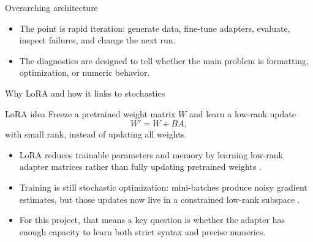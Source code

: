\documentclass[aspectratio=169,professionalfonts]{beamer}
\begin{document}
\begin{frame}{Overarching architecture}
\centering
{}

\vspace{0.8em}
\begin{itemize}[itemsep=0.5em]
    \item The point is rapid iteration: generate data, fine-tune adapters, evaluate, inspect failures, and change the next run.
    \item The diagnostics are designed to tell whether the main problem is formatting, optimization, or numeric behavior.
\end{itemize}
\end{frame}

\begin{frame}{Why LoRA and how it links to stochastics}
\begin{block}{LoRA idea}
Freeze a pretrained weight matrix $W$ and learn a low-rank update
\[
W' = W + BA,
\]
with small rank, instead of updating all weights.
\end{block}

\begin{itemize}[itemsep=0.6em]
    \item LoRA reduces trainable parameters and memory by learning low-rank adapter matrices rather than fully updating pretrained weights \cite{lora}.
    \item Training is still stochastic optimization: mini-batches produce noisy gradient estimates, but those updates now live in a constrained low-rank subspace \cite{peft}.
    \item For this project, that means a key question is whether the adapter has enough capacity to learn both strict syntax and precise numerics.
\end{itemize}
\end{frame}
\end{document}
